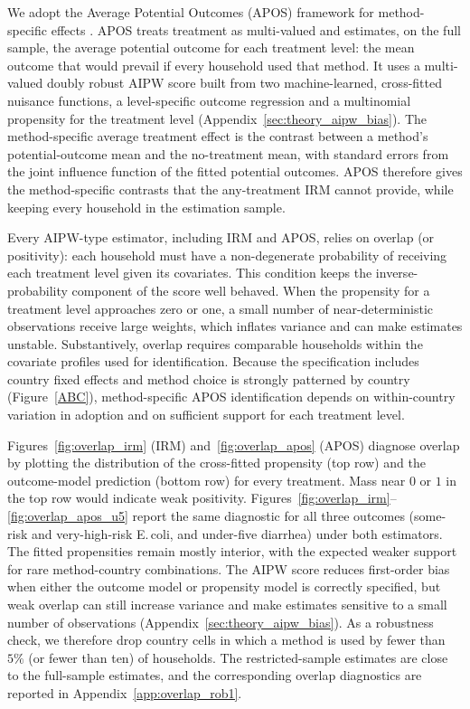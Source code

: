 \documentclass [11pt]{article}
\theoremstyle{plain}
\theoremstyle{definition}
\theoremstyle{remark}
\newcommand{\1}{\bm{1}}
\begin{document}
We adopt the Average Potential Outcomes (APOS) framework for method-specific effects \citep{doubleml2022}. APOS treats treatment as multi-valued and estimates, on the full sample, the average potential outcome for each treatment level: the mean outcome that would prevail if every household used that method. It uses a multi-valued doubly robust AIPW score built from two machine-learned, cross-fitted nuisance functions, a level-specific outcome regression and a multinomial propensity for the treatment level (Appendix~\ref{sec:theory_aipw_bias}). The method-specific average treatment effect is the contrast between a method's potential-outcome mean and the no-treatment mean, with standard errors from the joint influence function of the fitted potential outcomes. APOS therefore gives the method-specific contrasts that the any-treatment IRM cannot provide, while keeping every household in the estimation sample.

Every AIPW-type estimator, including IRM and APOS, relies on overlap (or positivity): each household must have a non-degenerate probability of receiving each treatment level given its covariates. This condition keeps the inverse-probability component of the score well behaved. When the propensity for a treatment level approaches zero or one, a small number of near-deterministic observations receive large weights, which inflates variance and can make estimates unstable. Substantively, overlap requires comparable households within the covariate profiles used for identification. Because the specification includes country fixed effects and method choice is strongly patterned by country (Figure~\ref{ABC}), method-specific APOS identification depends on within-country variation in adoption and on sufficient support for each treatment level.

Figures~\ref{fig:overlap_irm} (IRM) and~\ref{fig:overlap_apos} (APOS) diagnose overlap by plotting the distribution of the cross-fitted propensity (top row) and the outcome-model prediction (bottom row) for every treatment. Mass near $0$ or $1$ in the top row would indicate weak positivity. Figures~\ref{fig:overlap_irm}--\ref{fig:overlap_apos_u5} report the same diagnostic for all three outcomes (some-risk and very-high-risk E.\,coli, and under-five diarrhea) under both estimators. The fitted propensities remain mostly interior, with the expected weaker support for rare method-country combinations. The AIPW score reduces first-order bias when either the outcome model or propensity model is correctly specified, but weak overlap can still increase variance and make estimates sensitive to a small number of observations (Appendix~\ref{sec:theory_aipw_bias}). As a robustness check, we therefore drop country cells in which a method is used by fewer than $5\%$ (or fewer than ten) of households. The restricted-sample estimates are close to the full-sample estimates, and the corresponding overlap diagnostics are reported in Appendix~\ref{app:overlap_rob1}.
\end{document}
